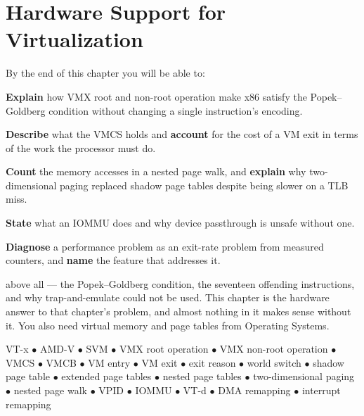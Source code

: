 \chapter{Hardware Support for Virtualization}\label{ch:hardware}

\begin{outcomes}
By the end of this chapter you will be able to:
\begin{tight}
  \item \textbf{Explain} how VMX root and non-root operation make x86 satisfy
        the Popek--Goldberg condition without changing a single instruction's
        encoding.
  \item \textbf{Describe} what the VMCS holds and \textbf{account} for the cost
        of a VM exit in terms of the work the processor must do.
  \item \textbf{Count} the memory accesses in a nested page walk, and
        \textbf{explain} why two-dimensional paging replaced shadow page tables
        despite being slower on a TLB miss.
  \item \textbf{State} what an IOMMU does and why device passthrough is unsafe
        without one.
  \item \textbf{Diagnose} a performance problem as an exit-rate problem from
        measured counters, and \textbf{name} the feature that addresses it.
\end{tight}
\end{outcomes}

\begin{prereq}
 above all --- the Popek--Goldberg condition, the seventeen
offending instructions, and why trap-and-emulate could not be used. This
chapter is the hardware answer to that chapter's problem, and almost nothing in
it makes sense without it. You also need virtual memory and page tables from
Operating Systems.
\end{prereq}

\begin{keyterms}
VT-x $\bullet$ AMD-V $\bullet$ SVM $\bullet$ VMX root operation $\bullet$ VMX
non-root operation $\bullet$ VMCS $\bullet$ VMCB $\bullet$ VM entry $\bullet$
VM exit $\bullet$ exit reason $\bullet$ world switch $\bullet$ shadow page
table $\bullet$ extended page tables $\bullet$ nested page tables $\bullet$
two-dimensional paging $\bullet$ nested page walk $\bullet$ VPID $\bullet$
IOMMU $\bullet$ VT-d $\bullet$ DMA remapping $\bullet$ interrupt remapping
\end{keyterms}

